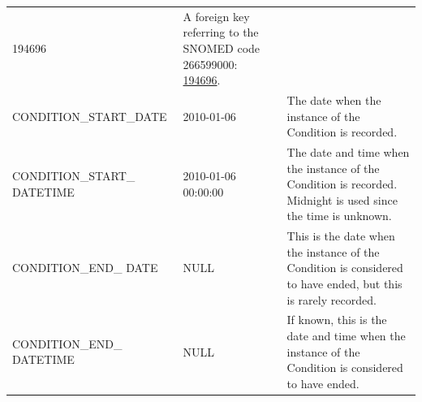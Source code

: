 \documentclass[11pt]{book}
\theoremstyle{definition}
\theoremstyle{definition}
\theoremstyle{definition}
\theoremstyle{remark}
\begin{document}
\begin{longtable}[]{@{}lll@{}}
\begin{minipage}[t]{0.15\columnwidth}
194696\strut
\end{minipage} & \begin{minipage}[t]{0.49\columnwidth}\raggedright
A foreign key referring to the SNOMED code 266599000: \href{http://athena.ohdsi.org/search-terms/terms/194696}{194696}.\strut
\end{minipage}\tabularnewline
\begin{minipage}[t]{0.28\columnwidth}\raggedright
CONDITION\_START\_DATE\strut
\end{minipage} & \begin{minipage}[t]{0.15\columnwidth}\raggedright
2010-01-06\strut
\end{minipage} & \begin{minipage}[t]{0.49\columnwidth}\raggedright
The date when the instance of the Condition is recorded.\strut
\end{minipage}\tabularnewline
\begin{minipage}[t]{0.28\columnwidth}\raggedright
CONDITION\_START\_ DATETIME\strut
\end{minipage} & \begin{minipage}[t]{0.15\columnwidth}\raggedright
2010-01-06 00:00:00\strut
\end{minipage} & \begin{minipage}[t]{0.49\columnwidth}\raggedright
The date and time when the instance of the Condition is recorded. Midnight is used since the time is unknown.\strut
\end{minipage}\tabularnewline
\begin{minipage}[t]{0.28\columnwidth}\raggedright
CONDITION\_END\_ DATE\strut
\end{minipage} & \begin{minipage}[t]{0.15\columnwidth}\raggedright
NULL\strut
\end{minipage} & \begin{minipage}[t]{0.49\columnwidth}\raggedright
This is the date when the instance of the Condition is considered to have ended, but this is rarely recorded.\strut
\end{minipage}\tabularnewline
\begin{minipage}[t]{0.28\columnwidth}\raggedright
CONDITION\_END\_ DATETIME\strut
\end{minipage} & \begin{minipage}[t]{0.15\columnwidth}\raggedright
NULL\strut
\end{minipage} & \begin{minipage}[t]{0.49\columnwidth}\raggedright
If known, this is the date and time when the instance of the Condition is considered to have ended.\strut

\end{minipage}
\end{longtable}
\end{document}
